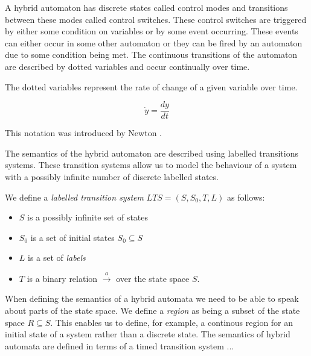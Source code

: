 \medskip
A hybrid automaton has discrete states called control modes and transitions between these modes called control switches. These control switches are triggered by either some condition on variables or by some event occurring. These events can either occur in some other automaton or they can be fired by an automaton due to some condition being met. The continuous transitions of the automaton are described by dotted variables and occur continually over time.
\medskip
\begin{myremark}
The dotted variables represent the rate of change of a given variable over time.

$$\dot{y} = \frac{dy}{dt}$$

This notation was introduced by Newton \cite{CF28}.
\end{myremark}
\medskip
The semantics of the hybrid automaton are described using labelled transitions systems. These transition systems allow us to model the behaviour of a system with a possibly infinite number of discrete labelled states. 
\medskip
\begin{mydef}
We define a \emph{labelled transition system} $LTS = (S,S_0,T,L)$ as follows:
\begin{itemize}

\item $S$ is a possibly infinite set of states

\item $S_0$ is a set of initial states $S_0 \subseteq S$

\item $L$ is a set of \emph{labels}

\item $T$ is a binary relation $\xrightarrow{a}$ over the state space $S$.

\end{itemize}
\end{mydef}
\medskip
When defining the semantics of a hybrid automata we need to be able to speak about parts of the state space.  We define a \emph{region} as being a subset of the state space $R \subseteq S$.  This enables us to define, for example, a continous region for an initial state of a system rather than a discrete state. The semantics of hybrid automata are defined in terms of a timed transition system ...


